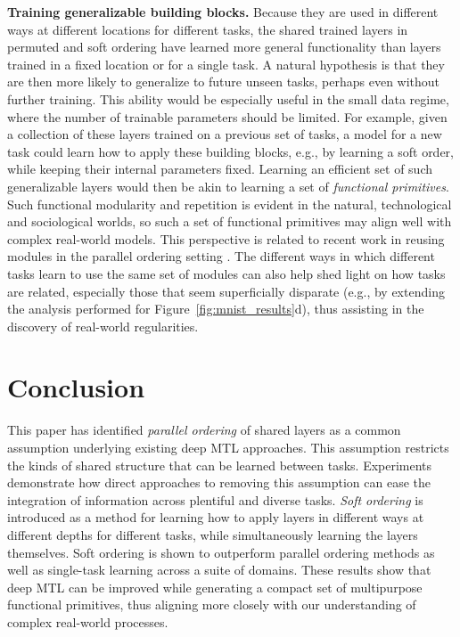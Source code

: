 \documentclass{article}
\theoremstyle{definition}
\theoremstyle{remark}
\begin{document}
\textbf{Training generalizable building blocks.}
Because they are used in different ways at different locations for different tasks, the shared trained layers in permuted and soft ordering have learned more general functionality than layers trained in a fixed location or for a single task.
A natural hypothesis is that they are then more likely to generalize to future unseen tasks, perhaps even without further training.
This ability would be especially useful in the small data regime, where the number of trainable parameters should be limited.
For example, given a collection of these layers trained on a previous set of tasks, a model for a new task could learn how to apply these building blocks, e.g., by learning a soft order, while keeping their internal parameters fixed.
Learning an efficient set of such generalizable layers would then be akin to learning a set of \emph{functional primitives}.
Such functional modularity and repetition is evident in the natural, technological and sociological worlds, so such a set of functional primitives may align well with complex real-world models.
This perspective is related to recent work in reusing modules in the parallel ordering setting \citep{Fernando:2017}.
The different ways in which different tasks learn to use the same set of modules can also help shed light on how tasks are related, especially those that seem superficially disparate (e.g., by extending the analysis performed for Figure~\ref{fig:mnist_results}d), thus assisting in the discovery of real-world regularities.

\section{Conclusion}

This paper has identified \emph{parallel ordering} of shared layers as a common assumption underlying existing deep MTL approaches.
This assumption restricts the kinds of shared structure that can be learned between tasks.
Experiments demonstrate how direct approaches to removing this assumption can ease the integration of information across plentiful and diverse tasks.
\emph{Soft ordering} is introduced as a method for learning how to apply layers in different ways at different depths for different tasks, while simultaneously learning the layers themselves.
Soft ordering is shown to outperform parallel ordering methods as well as single-task learning across a suite of domains.
These results show that deep MTL can be improved while generating a compact set of multipurpose functional primitives, thus aligning more closely with our understanding of complex real-world processes.
\end{document}
